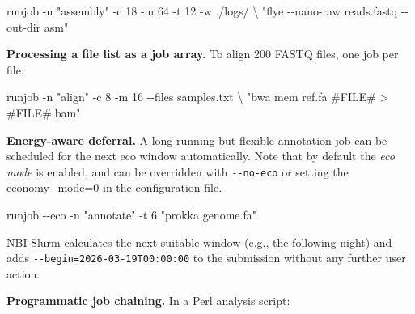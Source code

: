 \documentclass[
]{article}
\newenvironment{Shaded}{}{}
\newcommand{\AttributeTok}[1]{\textcolor[rgb]{0.49,0.56,0.16}{#1}}
\newcommand{\DataTypeTok}[1]{\textcolor[rgb]{0.56,0.13,0.00}{#1}}
\newcommand{\ExtensionTok}[1]{#1}
\newcommand{\NormalTok}[1]{#1}
\newcommand{\StringTok}[1]{\textcolor[rgb]{0.25,0.44,0.63}{#1}}
\begin{document}
\begin{Shaded}
\begin{Highlighting}[]
\ExtensionTok{runjob} \AttributeTok{{-}n} \StringTok{"assembly"} \AttributeTok{{-}c}\NormalTok{ 18 }\AttributeTok{{-}m}\NormalTok{ 64 }\AttributeTok{{-}t}\NormalTok{ 12 }\AttributeTok{{-}w}\NormalTok{ ./logs/ }\DataTypeTok{\textbackslash{}}
  \StringTok{"flye {-}{-}nano{-}raw reads.fastq {-}{-}out{-}dir asm"}
\end{Highlighting}
\end{Shaded}

\textbf{Processing a file list as a job array.} To align 200 FASTQ
files, one job per file:

\begin{Shaded}
\begin{Highlighting}[]
\ExtensionTok{runjob} \AttributeTok{{-}n} \StringTok{"align"} \AttributeTok{{-}c}\NormalTok{ 8 }\AttributeTok{{-}m}\NormalTok{ 16 }\AttributeTok{{-}{-}files}\NormalTok{ samples.txt }\DataTypeTok{\textbackslash{}}
  \StringTok{"bwa mem ref.fa \#FILE\# \textgreater{} \#FILE\#.bam"}
\end{Highlighting}
\end{Shaded}

\textbf{Energy-aware deferral.} A long-running but flexible annotation
job can be scheduled for the next eco window automatically. Note that by
default the \emph{eco mode} is enabled, and can be overridden with
\texttt{-\/-no-eco} or setting the economy\_mode=0 in the configuration
file.

\begin{Shaded}
\begin{Highlighting}[]
\ExtensionTok{runjob} \AttributeTok{{-}{-}eco} \AttributeTok{{-}n} \StringTok{"annotate"} \AttributeTok{{-}t}\NormalTok{ 6 }\StringTok{"prokka genome.fa"}
\end{Highlighting}
\end{Shaded}

NBI-Slurm calculates the next suitable window (e.g., the following
night) and adds \texttt{-\/-begin=2026-03-19T00:00:00} to the submission
without any further user action.

\textbf{Programmatic job chaining.} In a Perl analysis script:
\end{document}
